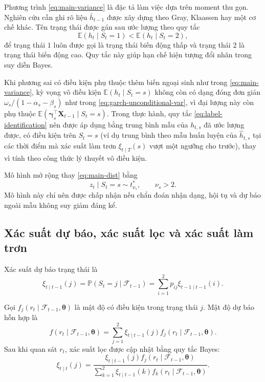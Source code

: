 \documentclass[12pt,a4paper]{article}
\numberwithin{equation}{section}
\newcommand{\bm}[1]{\symbf{#1}}
\newcommand{\Info}{\mathcal{F}}
\newcommand{\Param}{\bm{\theta}}
\newcommand{\Xvec}{\bm{X}}
\newcommand{\E}{\mathbb{E}}
\newcommand{\Prob}{\mathbb{P}}
\begin{document}
Phương trình \cref{eq:main-variance} là đặc tả làm việc dựa trên moment thu gọn. Nghiên cứu cần ghi rõ liệu $\bar h_{t-1}$ được xây dựng theo Gray, Klaassen hay một cơ chế khác. Tên trạng thái được gán sau ước lượng theo quy tắc
\begin{equation}
  \E(h_t\mid S_t=1)<\E(h_t\mid S_t=2),
  \label{eq:label-identification}
\end{equation}
để trạng thái $1$ luôn được gọi là trạng thái biến động thấp và trạng thái $2$ là trạng thái biến động cao. Quy tắc này giúp hạn chế hiện tượng đổi nhãn trong suy diễn Bayes.

Khi phương sai có điều kiện phụ thuộc thêm biến ngoại sinh như trong \cref{eq:main-variance}, kỳ vọng vô điều kiện $\E(h_t\mid S_t=s)$ không còn có dạng đóng đơn giản $\omega_s/(1-\alpha_s-\beta_s)$ như trong \cref{eq:garch-unconditional-var}, vì đại lượng này còn phụ thuộc $\E(\bm\gamma_s^{\top}\Xvec_{t-1}\mid S_t=s)$. Trong thực hành, quy tắc \cref{eq:label-identification} nên được áp dụng bằng trung bình mẫu của $h_{t,s}$ đã ước lượng được, có điều kiện trên $S_t=s$ (ví dụ trung bình theo mẫu huấn luyện của $\widehat h_{t,s}$ tại các thời điểm mà xác suất làm trơn $\xi_{t\mid T}(s)$ vượt một ngưỡng cho trước), thay vì tính theo công thức lý thuyết vô điều kiện.

Mô hình mở rộng thay \cref{eq:main-dist} bằng
\begin{equation}
  z_t\mid S_t=s\sim t_{\nu_s}^{*},
  \qquad \nu_s>2.
  \label{eq:state-specific-df}
\end{equation}
Mô hình này chỉ nên được chấp nhận nếu chẩn đoán nhận dạng, hội tụ và dự báo ngoài mẫu không suy giảm đáng kể.

\subsection{Xác suất dự báo, xác suất lọc và xác suất làm trơn}\label{subsec:state-probabilities}

Xác suất dự báo trạng thái là
\begin{equation}
  \xi_{t\mid t-1}(j)
  =
  \Prob(S_t=j\mid\Info_{t-1})
  =
  \sum_{i=1}^{2}p_{ij}\xi_{t-1\mid t-1}(i).
  \label{eq:predicted-state-prob}
\end{equation}

Gọi $f_j(r_t\mid\Info_{t-1},\Param)$ là mật độ có điều kiện trong trạng thái $j$. Mật độ dự báo hỗn hợp là
\begin{equation}
  f(r_t\mid\Info_{t-1},\Param)
  =
  \sum_{j=1}^{2}
  \xi_{t\mid t-1}(j)
  f_j(r_t\mid\Info_{t-1},\Param).
  \label{eq:mixture-predictive-density}
\end{equation}
Sau khi quan sát $r_t$, xác suất lọc được cập nhật bằng quy tắc Bayes:
\begin{equation}
  \xi_{t\mid t}(j)
  =
  \frac{
    \xi_{t\mid t-1}(j)f_j(r_t\mid\Info_{t-1},\Param)
  }{
    \sum_{k=1}^{2}\xi_{t\mid t-1}(k)f_k(r_t\mid\Info_{t-1},\Param)
  }.
  \label{eq:filtered-state-prob}
\end{equation}
\end{document}
